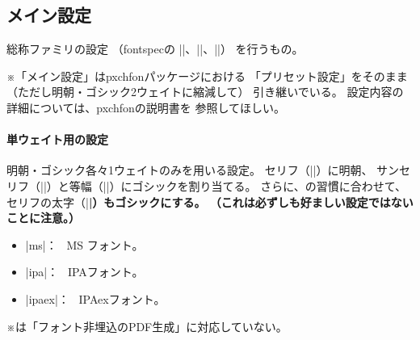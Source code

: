 \documentclass[xelatex,ja=standard,a4paper]{bxjsarticle}
\newcommand{\Pkg}[1]{\textsf{#1}}
\newcommand{\Note}{\par\noindent ※}
\newcommand{\Means}{：\ }
\begin{document}
\subsection{メイン設定}

総称ファミリの設定
（\Pkg{fontspec}の |\setmainfont|、|\setsansfont|、|\setmonofont|）
を行うもの。

\Note 「メイン設定」は\Pkg{pxchfon}パッケージにおける
「プリセット設定」をそのまま
（ただし明朝・ゴシック2ウェイトに縮減して）
引き継いでいる。
設定内容の詳細については、\Pkg{pxchfon}の説明書を
参照してほしい。

\paragraph{単ウェイト用の設定}
明朝・ゴシック各々1ウェイトのみを用いる設定。
セリフ（|\rmfamily|）に明朝、
サンセリフ（|\sffamily|）と等幅（|\ttfamily|）にゴシックを割り当てる。
さらに、{\pLaTeX}\>の習慣に合わせて、
セリフの太字（|\bfseries|）もゴシックにする。
（これは必ずしも好ましい設定ではないことに注意。）

\begin{itemize}
\item |ms|\Means
MS フォント。
\item |ipa|\Means
IPAフォント。
\item |ipaex|\Means
IPAexフォント。
\end{itemize}
\Note {\XeTeX}\>は「フォント非埋込のPDF生成」に対応していない。
\end{document}
